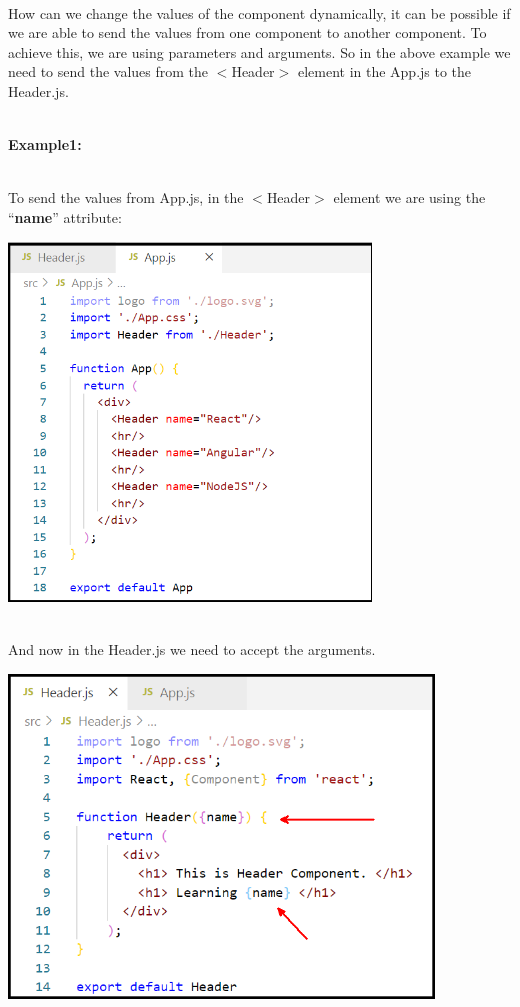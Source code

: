 \documentclass{article}
\begin{document}
\noindent 

\noindent \\
How can we change the values of the component dynamically, it can be possible if we are able to send the values from one component to another component. To achieve this, we are using parameters and arguments. So in the above example we need to send the values from the $\mathrm{<}$Header$\mathrm{>}$ element in the App.js to the Header.js.

\noindent 

\noindent \\
\textbf{Example1:}

\noindent \\
To send the values from App.js, in the $\mathrm{<}$Header$\mathrm{>}$ element we are using the ``\textbf{name}'' attribute:

\begin{center}
	\noindent \includegraphics*[width=3.79in, height=3.75in]{IMG-08-04}
\end{center}

\noindent 
\newpage
\noindent \\
And now in the Header.js we need to accept the arguments.

\begin{center}
	\noindent \includegraphics*[width=4.45in, height=3.39in]{IMG-08-05}
\end{center}
\end{document}
